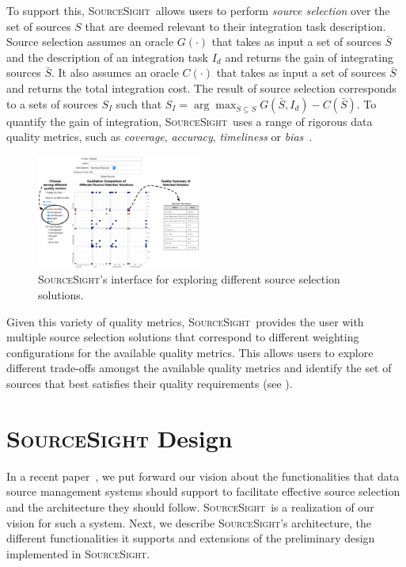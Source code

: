 \documentclass{vldb}
\newcommand\system{\textsc{SourceSight}}
\begin{document}
To support this, \system~allows users to perform {\em source selection} over the set of sources $S$ that are deemed relevant to their integration task description. Source selection assumes an oracle $G(\cdot)$ that takes as input a set of sources $\bar{S}$ and the description of an integration task $I_d$ and returns the gain of integrating sources $\bar{S}$. It also assumes an oracle $C(\cdot)$ that takes as input a set of sources $\bar{S}$ and returns the total integration cost. The result of source selection corresponds to a sets of sources $S_I$ such that $S_I = \arg\max_{\bar{S} \subseteq S}G(\bar{S},I_d) - C(\bar{S})$. To quantify the gain of integration, \system~uses a range of rigorous data quality metrics, such as {\em coverage}, {\em accuracy}, {\em timeliness} or {\em bias}~\cite{dong:vldb13,rekatsinas:2014,rekatsinas:2015}. 

\begin{figure}
	\begin{center}
	\includegraphics[trim=0 0 0 85, clip,width=0.48\textwidth]{fig/ssResults}
	\caption{\system's interface for exploring different source selection solutions.}
	\label{fig:ssresults}
	\end{center}
	\vspace{-20pt}
\end{figure}

Given this variety of quality metrics, \system~provides the user with multiple source selection solutions that correspond to different weighting configurations for the available quality metrics. This allows users to explore different trade-offs amongst the available quality metrics and identify the set of sources that best satisfies their quality requirements (see ).

\section{{\Large \system} Design}
\label{sec:design}
In a recent paper~\cite{rekatsinas:2015}, we put forward our vision about the functionalities that data source management systems should support to facilitate effective source selection and the architecture they should follow. 
\system~is a realization of our vision for such a system. Next, we describe \system's architecture, the different functionalities it supports and extensions of the preliminary design implemented in \system.%
\end{document}
